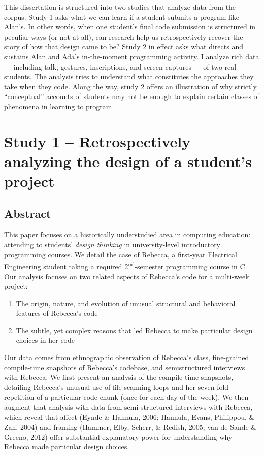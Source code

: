 This dissertation is structured into two studies that analyze data from
the corpus. Study 1 asks what we can learn if a student submits a
program like Alan's. In other words, when one student's final code
submission is structured in peculiar ways (or not at all), can research
help us retrospectively recover the story of how that design came to be?
Study 2 in effect asks what directs and sustains Alan and Ada's
in-the-moment programming activity. I analyze rich data --- including
talk, gestures, inscriptions, and screen captures --- of two real
students. The analysis tries to understand what constitutes the
approaches they take when they code. Along the way, study 2 offers an
illustration of why strictly ``conceptual'' accounts of students may not
be enough to explain certain classes of phenomena in learning to
program.

\section{Study 1 -- Retrospectively analyzing the design of a student's
project}\label{study-1-retrospectively-analyzing-the-design-of-a-students-project}

\subsection{Abstract}\label{abstract}

This paper focuses on a historically understudied area in computing
education: attending to students' \emph{design thinking} in
university-level introductory programming courses. We detail the case of
Rebecca, a first-year Electrical Engineering student taking a required
2\textsuperscript{nd}-semester programming course in C. Our analysis
focuses on two related aspects of Rebecca's code for a multi-week
project:

\begin{enumerate}
\def\labelenumi{\arabic{enumi}.}
\item
  The origin, nature, and evolution of unusual structural and behavioral
  features of Rebecca's code
\item
  The subtle, yet complex reasons that led Rebecca to make particular
  design choices in her code
\end{enumerate}

Our data comes from ethnographic observation of Rebecca's class,
fine-grained compile-time snapshots of Rebecca's codebase, and
semistructured interviews with Rebecca. We first present an analysis of
the compile-time snapshots, detailing Rebecca's unusual use of
file-scanning loops and her seven-fold repetition of a particular code
chunk (once for each day of the week). We then augment that analysis
with data from semi-structured interviews with Rebecca, which reveal
that affect (Eynde \& Hannula, 2006; Hannula, Evans, Philippou, \& Zan,
2004) and framing (Hammer, Elby, Scherr, \& Redish, 2005; van de Sande
\& Greeno, 2012) offer substantial explanatory power for understanding
why Rebecca made particular design choices.


